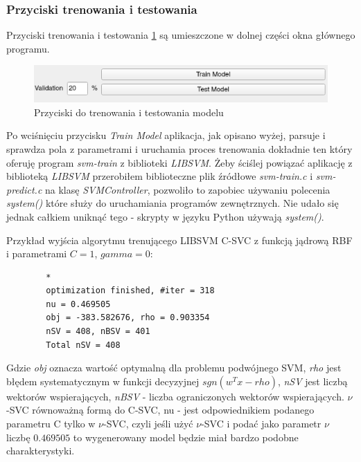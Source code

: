 \documentclass[paper=a4, fontsize=11pt]{scrartcl} %
\numberwithin{equation}{section} %
\numberwithin{figure}{section} %
\begin{document}
\subsubsection{Przyciski trenowania i testowania}


    \par Przyciski trenowania i testowania \ref{fig:train_test_buttons} są umieszczone w dolnej
    części okna głównego programu.

    \begin{figure}[h]
        \begin{center}
            \includegraphics[scale=1.0]{./img/train_test_buttons.png}
            \caption{Przyciski do trenowania i testowania modelu}
            \label{fig:train_test_buttons}
        \end{center}
    \end{figure}

    \par Po wciśnięciu przycisku \textit{Train Model} aplikacja, jak opisano wyżej,
    parsuje i sprawdza pola z parametrami i uruchamia proces trenowania dokładnie ten który
    oferuję program \textit{svm-train} z biblioteki \textit{LIBSVM}. Żeby ściślej powiązać
    aplikację z biblioteką \textit{LIBSVM} przerobiłem biblioteczne plik źródłowe
    \textit{svm-train.c} i \textit{svm-predict.c} na klasę \textit{SVMController}, pozwoliło to
    zapobiec używaniu polecenia \textit{system()} które służy do uruchamiania programów
    zewnętrznych. Nie udało się jednak całkiem uniknąć tego - skrypty w języku Python używają
    \textit{system()}.

    Przykład wyjścia algorytmu trenującego LIBSVM C-SVC z funkcją jądrową RBF i parametrami
    $C=1$, $gamma=0$:

    \begin{verbatim}
        *
        optimization finished, #iter = 318
        nu = 0.469505
        obj = -383.582676, rho = 0.903354
        nSV = 408, nBSV = 401
        Total nSV = 408
    \end{verbatim}

    \par Gdzie \textit{obj} oznacza wartość optymalną dla problemu podwójnego SVM, \textit{rho}
    jest błędem systematycznym w funkcji decyzyjnej $sgn(w^{T}x - rho)$, \textit{nSV} jest
    liczbą wektorów wspierających, \textit{nBSV} - liczba ograniczonych  wektorów
    wspierających. $\nu$-SVC równoważną formą do C-SVC, nu - jest odpowiednikiem podanego
    parametru C tylko w $\nu$-SVC, czyli jeśli użyć $\nu$-SVC i podać jako parametr $\nu$
    liczbę $0.469505$ to wygenerowany model będzie miał bardzo podobne charakterystyki.
\end{document}
